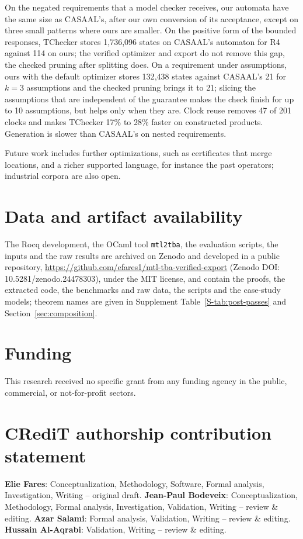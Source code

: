 \documentclass[preprint,12pt]{elsarticle}
\providecommand{\href}[2]{#2}
\begin{document}
On the negated requirements that a model checker receives, our automata have the same size as CASAAL's, after our own conversion of its acceptance, except on three small patterns where ours are smaller. On the positive form of the bounded responses, TChecker stores 1{,}736{,}096 states on CASAAL's automaton for R4 against 114 on ours; the verified optimizer and export do not remove this gap, the checked pruning after splitting does. On a requirement under assumptions, ours with the default optimizer stores 132{,}438 states against CASAAL's 21 for $k=3$ assumptions and the checked pruning brings it to 21; slicing the assumptions that are independent of the guarantee makes the check finish for up to 10 assumptions, but helps only when they are. Clock reuse removes 47 of 201 clocks and makes TChecker 17\% to 28\% faster on constructed products. Generation is slower than CASAAL's on nested requirements.

Future work includes further optimizations, such as certificates that merge locations, and a richer supported language, for instance the past operators; industrial corpora are also open.

\section*{Data and artifact availability}
\label{sec:availability}
The Rocq development, the OCaml tool \texttt{mtl2tba}, the evaluation scripts, the inputs and the raw results are archived on Zenodo and developed in a public repository, \url{https://github.com/efares1/mtl-tba-verified-export} (Zenodo DOI: \href{https://doi.org/10.5281/zenodo.24478303}{10.5281/zenodo.24478303}), under the MIT license, and contain the proofs, the extracted code, the benchmarks and raw data, the scripts and the case-study models; theorem names are given in Supplement Table~\ref{S-tab:post-passes} and Section~\ref{sec:composition}.
\section*{Funding}
This research received no specific grant from any funding agency in the public, commercial, or not-for-profit sectors.

\section*{CRediT authorship contribution statement}
\textbf{Elie Fares}: Conceptualization, Methodology, Software, Formal analysis, Investigation, Writing -- original draft. \textbf{Jean-Paul Bodeveix}: Conceptualization, Methodology, Formal analysis, Investigation, Validation, Writing -- review \& editing. \textbf{Azar Salami}: Formal analysis, Validation, Writing -- review \& editing. \textbf{Hussain Al-Aqrabi}: Validation, Writing -- review \& editing.
\end{document}
